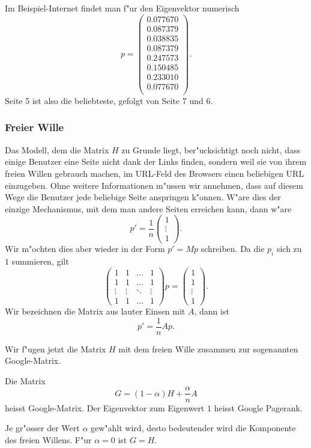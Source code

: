 Im Beispiel-Internet findet man f"ur den Eigenvektor numerisch
\[
p=
\begin{pmatrix}
   0.077670\\
   0.087379\\
   0.038835\\
   0.087379\\
   0.247573\\
   0.150485\\
   0.233010\\
   0.077670\\
\end{pmatrix}.
\]
Seite  5 ist also die beliebteste, gefolgt von Seite 7 und 6.

\subsubsection{Freier Wille}
Das Modell, dem die Matrix $H$ zu Grunde liegt, ber"ucksichtigt
noch nicht, dass einige Benutzer eine Seite nicht dank der Links
finden, sondern weil sie von ihrem freien Willen gebrauch machen,
im URL-Feld des Browsers einen beliebigen URL einzugeben.
Ohne weitere Informationen m"ussen wir annehmen, dass auf diesem
Wege die Benutzer jede beliebige Seite anspringen k"onnen.
W"are dies der einzige Mechanismus, mit dem man andere Seiten erreichen
kann, dann w"are
\[
p'=\frac1n\begin{pmatrix}
1\\\vdots\\1
\end{pmatrix}.
\]
Wir m"ochten dies aber wieder in der Form $p'=Mp$ schreiben.
Da die $p_i$ sich zu $1$ summieren, gilt
\[
\begin{pmatrix}
     1&     1&\dots &     1\\
     1&     1&\dots &     1\\
\vdots&\vdots&\ddots&\vdots\\
     1&     1&\dots &     1
\end{pmatrix}
p=\begin{pmatrix}1\\1\\\vdots\\1\end{pmatrix}.
\]
Wir bezeichnen die Matrix aus lauter Einsen mit $A$, dann ist
\[
p'=\frac{1}{n}Ap.
\]

Wir f"ugen jetzt die Matrix $H$ mit dem freien Wille zusammen zur 
sogenannten Google-Matrix.
\begin{definition}
Die Matrix 
\[
G=(1-\alpha)H+\frac{\alpha}nA
\]
heisst Google-Matrix.
Der Eigenvektor zum Eigenwert $1$ heisst Google Pagerank.
\end{definition}
Je gr"osser der Wert $\alpha$ gew"ahlt wird, desto bedeutender wird die
Komponente des freien Willens. F"ur $\alpha=0$ ist $G=H$.

